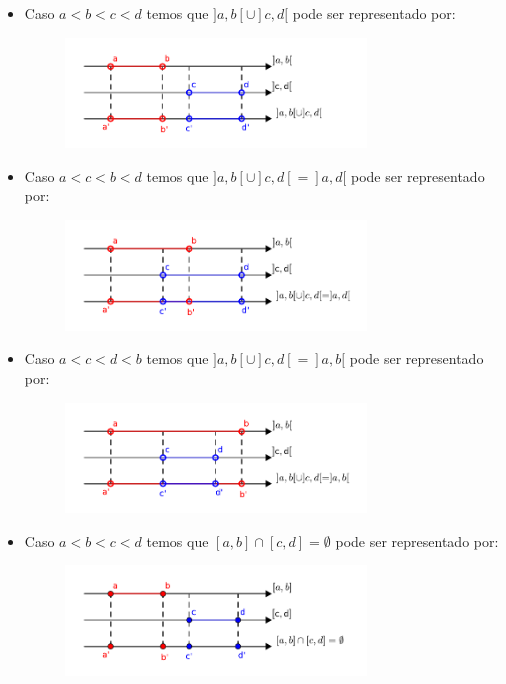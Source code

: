 \begin{itemize}
 \item Caso $a< b< c< d$ temos que $]a, b[ \cup ]c, d[$ pode ser representado por:
  \begin{figure}[H]
 \centering
 \includegraphics[width=8cm]{Capitulos/Figuras/uniao-a-b-c-d.pdf}
 \end{figure}

 \item Caso $a< c< b< d$ temos que $]a, b[ \cup ]c, d[= ]a, d[$ pode ser representado por:
  \begin{figure}[H]
 \centering
 \includegraphics[width=8cm]{Capitulos/Figuras/uniao-acb-d.pdf}
 \end{figure}

   \item Caso $a< c< d< b$ temos que $]a, b[ \cup ]c, d[= ]a, b[$ pode ser representado por:
  \begin{figure}[H]
 \centering
 \includegraphics[width=8cm]{Capitulos/Figuras/uniao-acd-b.pdf}
 \end{figure}

 \item Caso $a< b< c< d$ temos que $[a, b] \cap [c, d]= \emptyset$ pode ser representado por:
  \begin{figure}[H]
 \centering
 \includegraphics[width=8cm]{Capitulos/Figuras/intersecaoabcd.pdf}
 \end{figure}


\end{itemize}
